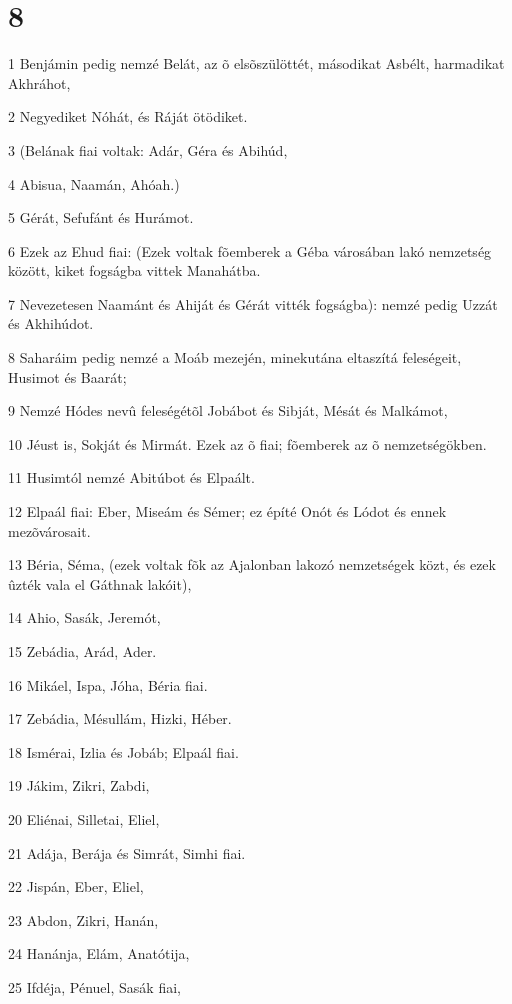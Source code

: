 \chapter{8}

\par 1 Benjámin pedig nemzé Belát, az õ elsõszülöttét, másodikat Asbélt, harmadikat Akhráhot,
\par 2 Negyediket Nóhát, és Ráját ötödiket.
\par 3 (Belának fiai voltak: Adár, Géra és Abihúd,
\par 4 Abisua, Naamán, Ahóah.)
\par 5 Gérát, Sefufánt és Hurámot.
\par 6 Ezek az Ehud fiai: (Ezek voltak fõemberek a Géba városában lakó nemzetség között, kiket fogságba vittek Manahátba.
\par 7 Nevezetesen Naamánt és Ahiját és Gérát vitték fogságba): nemzé pedig Uzzát és Akhihúdot.
\par 8 Saharáim pedig nemzé a Moáb mezején, minekutána eltaszítá feleségeit, Husimot és Baarát;
\par 9 Nemzé Hódes nevû feleségétõl Jobábot és Sibját, Mésát és Malkámot,
\par 10 Jéust is, Sokját és Mirmát. Ezek az õ fiai; fõemberek az õ nemzetségökben.
\par 11 Husimtól nemzé Abitúbot és Elpaált.
\par 12 Elpaál fiai: Eber, Miseám és Sémer; ez építé Onót és Lódot és ennek mezõvárosait.
\par 13 Béria, Séma, (ezek voltak fõk az Ajalonban lakozó nemzetségek közt, és ezek ûzték vala el Gáthnak lakóit),
\par 14 Ahio, Sasák, Jeremót,
\par 15 Zebádia, Arád, Ader.
\par 16 Mikáel, Ispa, Jóha, Béria fiai.
\par 17 Zebádia, Mésullám, Hizki, Héber.
\par 18 Ismérai, Izlia és Jobáb; Elpaál fiai.
\par 19 Jákim, Zikri, Zabdi,
\par 20 Eliénai, Silletai, Eliel,
\par 21 Adája, Berája és Simrát, Simhi fiai.
\par 22 Jispán, Eber, Eliel,
\par 23 Abdon, Zikri, Hanán,
\par 24 Hanánja, Elám, Anatótija,
\par 25 Ifdéja, Pénuel, Sasák fiai,
